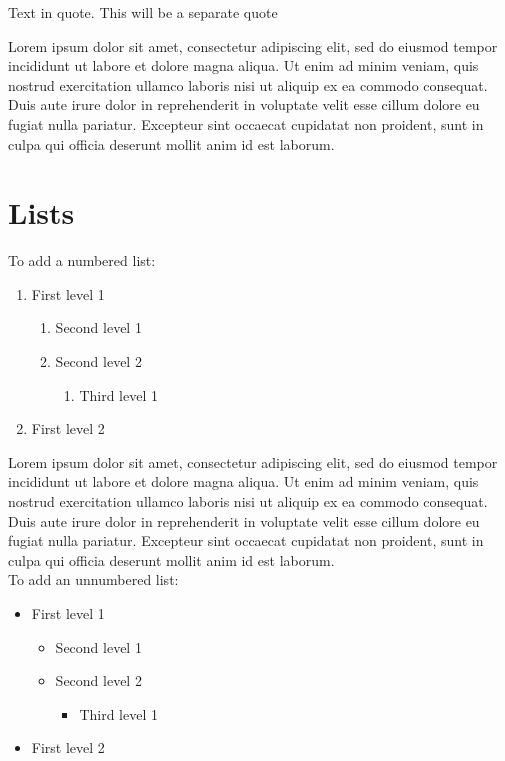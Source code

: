 \begin{displayquote}
 Text in quote.
 This will be a separate quote
\end{displayquote}

Lorem ipsum dolor sit amet, consectetur adipiscing elit, sed do eiusmod tempor incididunt ut labore et dolore magna aliqua. Ut enim ad minim veniam, quis nostrud exercitation ullamco laboris nisi ut aliquip ex ea commodo consequat. Duis aute irure dolor in reprehenderit in voluptate velit esse cillum dolore eu fugiat nulla pariatur. Excepteur sint occaecat cupidatat non proident, sunt in culpa qui officia deserunt mollit anim id est laborum.\\


\section{Lists}

To add a numbered list:


\begin{enumerate}
 \item First level 1
 \begin{enumerate}
  \item Second level 1
  \item Second level 2
  \begin{enumerate}
   \item Third level 1
  \end{enumerate}
 \end{enumerate}
 \item First level 2
\end{enumerate}


Lorem ipsum dolor sit amet, consectetur adipiscing elit, sed do eiusmod tempor incididunt ut labore et dolore magna aliqua. Ut enim ad minim veniam, quis nostrud exercitation ullamco laboris nisi ut aliquip ex ea commodo consequat. Duis aute irure dolor in reprehenderit in voluptate velit esse cillum dolore eu fugiat nulla pariatur. Excepteur sint occaecat cupidatat non proident, sunt in culpa qui officia deserunt mollit anim id est laborum.\\
To add an unnumbered list:

\begin{itemize}
 \item First level 1
 \begin{itemize}
  \item Second level 1
  \item Second level 2
  \begin{itemize}
   \item Third level 1
  \end{itemize}
 \end{itemize}
 \item First level 2
\end{itemize}


